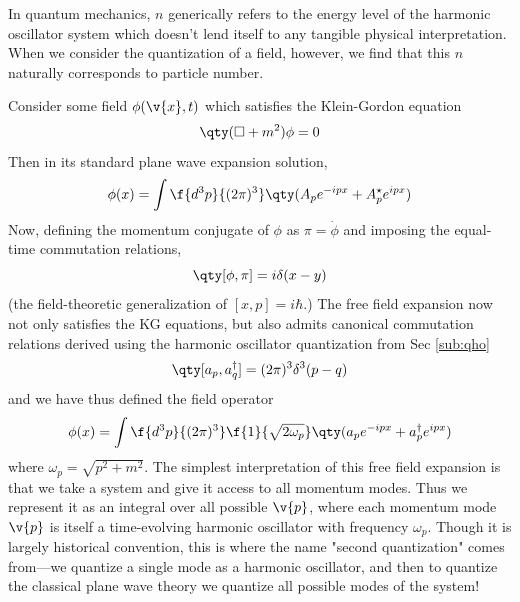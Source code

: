 In quantum mechanics, $n$ generically refers to the energy level of the harmonic oscillator system which doesn't lend itself to any tangible physical interpretation. When we consider the quantization of a field, however, we find that this $n$ naturally corresponds to particle number. 

Consider some field $\phi(\v{x},t)$ which satisfies the Klein-Gordon equation
\begin{equation}
    \qty(\Box+m^2)\phi=0
\end{equation}
Then in its standard plane wave expansion solution,
\[
\phi(x)=\int \f{d^3 p}{(2 \pi)^3}\qty(A_p e^{-i p x}+A_{p}^\star e^{i p x})
\]
Now, defining  the momentum conjugate of $\phi$ as $\pi=\dot{\phi}$ and imposing the equal-time commutation relations,
\begin{equation}
    \qty[\phi,\pi]=i\delta(x-y)
\end{equation}
(the field-theoretic generalization of $[x,p]=i\hbar$.)
The free field expansion now not only satisfies the KG equations, but also admits canonical commutation relations derived using the harmonic oscillator quantization from Sec \ref{sub:qho}
\begin{equation}
    \qty[a_p,a_q^\dagger]=(2\pi)^3\delta^3(p-q)
\end{equation}
and we have thus defined the field operator
\begin{equation}
    \phi(x)=\int \f{d^3 p}{(2 \pi)^3}\f{1}{\sqrt{2\omega_p}}\qty(a_p e^{-i p x}+a_{p}^\dagger e^{i p x})
\end{equation}
where $\omega_p=\sqrt{p^2+m^2}$. The simplest interpretation of this free field expansion is that we take a system and give it access to all momentum modes. Thus we represent it as an integral over all possible $\v{p}$, where each momentum mode $\v{p}$ is itself a time-evolving harmonic oscillator with frequency $\omega_p$. Though it is largely historical convention, this is where the name "second quantization" comes from—we quantize a single mode as a harmonic oscillator, and then to quantize the classical plane wave theory we quantize all possible modes of the system!






